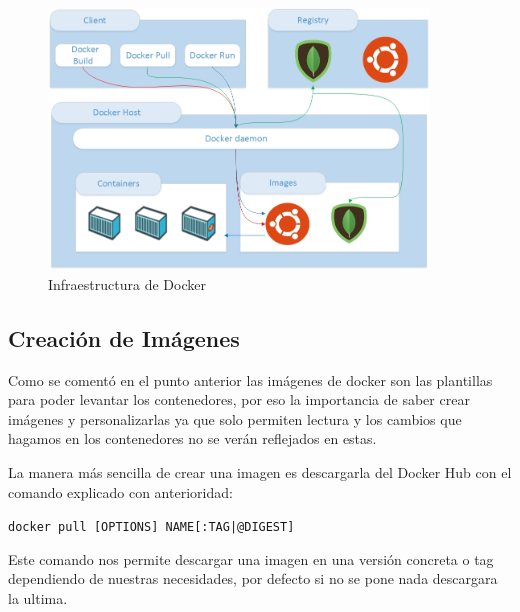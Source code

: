 \begin{figure}[htb]
\begin{center}
\includegraphics[width=0.90\textwidth]{./setup/Infraestructura}
\caption{Infraestructura de Docker}
\label{Inf:Infraestructura}
\end{center}
\end{figure}

\subsection{Creación de Imágenes}

Como se comentó en el punto anterior las imágenes de docker son las plantillas para poder levantar los contenedores, por eso la importancia de saber crear imágenes y personalizarlas ya que solo permiten lectura y los cambios que hagamos en los contenedores no se verán reflejados en estas.

La manera más sencilla de crear una imagen es descargarla del Docker Hub con el comando explicado con anterioridad:

\begin{center}
\texttt{docker pull [OPTIONS] NAME[:TAG|@DIGEST]}
\end{center}

Este comando nos permite descargar una imagen en una versión concreta o tag dependiendo de nuestras necesidades, por defecto si no se pone nada descargara la ultima. 

